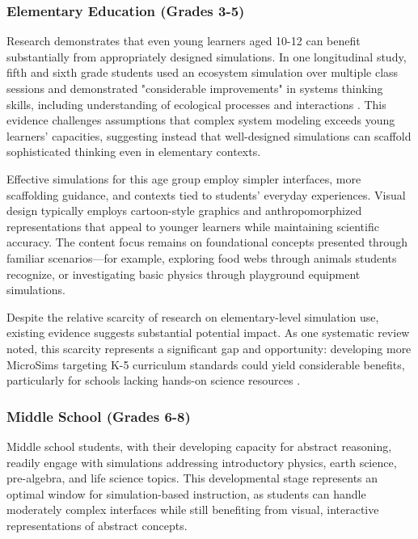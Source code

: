 \subsubsection{Elementary Education (Grades 3-5)}

Research demonstrates that even young learners aged 10-12 can benefit substantially from appropriately designed simulations. In one longitudinal study, fifth and sixth grade students used an ecosystem simulation over multiple class sessions and demonstrated "considerable improvements" in systems thinking skills, including understanding of ecological processes and interactions \cite{eric2009}. This evidence challenges assumptions that complex system modeling exceeds young learners' capacities, suggesting instead that well-designed simulations can scaffold sophisticated thinking even in elementary contexts.

Effective simulations for this age group employ simpler interfaces, more scaffolding guidance, and contexts tied to students' everyday experiences. Visual design typically employs cartoon-style graphics and anthropomorphized representations that appeal to younger learners while maintaining scientific accuracy. The content focus remains on foundational concepts presented through familiar scenarios---for example, exploring food webs through animals students recognize, or investigating basic physics through playground equipment simulations.

Despite the relative scarcity of research on elementary-level simulation use, existing evidence suggests substantial potential impact. As one systematic review noted, this scarcity represents a significant gap and opportunity: developing more MicroSims targeting K-5 curriculum standards could yield considerable benefits, particularly for schools lacking hands-on science resources \cite{mdpi2024}.

\subsubsection{Middle School (Grades 6-8)}

Middle school students, with their developing capacity for abstract reasoning, readily engage with simulations addressing introductory physics, earth science, pre-algebra, and life science topics. This developmental stage represents an optimal window for simulation-based instruction, as students can handle moderately complex interfaces while still benefiting from visual, interactive representations of abstract concepts.

